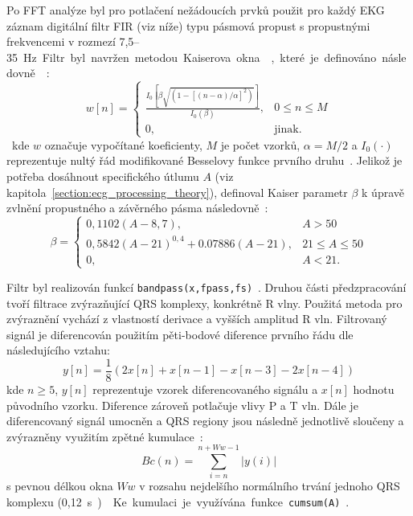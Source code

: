 Po FFT analýze byl pro potlačení nežádoucích prvků použit pro každý EKG záznam
digitální filtr FIR (viz níže) typu pásmová propust s propustnými frekvencemi v rozmezí
7,5--35~\si\Hz. Filtr byl navržen metodou Kaiserova okna~\cite{Chavan2006},
které je definováno následovně~\cite{Oppenheim1999}:
\begin{equation}
    \label{eq:kaiser1}
    w[n] =
    \begin{cases}
        \frac{I_0[\beta\sqrt{(1-[(n-\alpha)/\alpha]^2)}]}{I_0(\beta)}, & 0 \leq n \leq M \\
        0,                                                           & \text{jinak}.
    \end{cases}
\end{equation}
kde $w$ označuje vypočítané koeficienty, $M$ je počet vzorků, $\alpha=M/2$ a
$I_0(\cdot)$ reprezentuje nultý řád modifikované Besselovy funkce prvního
druhu~\cite{BesselFcn}. Jelikož je potřeba dosáhnout specifického útlumu $A$
(viz kapitola~\ref{section:ecg_processing_theory}), definoval Kaiser parametr
$\beta$ k úpravě zvlnění propustného a závěrného pásma
následovně~\cite{Oppenheim1999}:
\begin{equation}
    \beta =
    \begin{cases}
        0,1102(A-8,7),                      & A > 50            \\
        0,5842(A-21)^{0,4} + 0.07886(A-21), & 21 \leq A \leq 50 \\
        0,                                  & A < 21.
    \end{cases}
\end{equation}

Filtr byl realizován funkcí \texttt{bandpass(x,fpass,fs)}~\cite{matlabBANDPASS}.
Druhou části předzpracování tvoří filtrace zvýrazňující QRS komplexy, konkrétně
R vlny. Použitá metoda pro zvýraznění vychází z vlastností derivace a vyšších
amplitud R vln. Filtrovaný signál je diferencován použitím pěti-bodové diference
prvního řádu dle následujícího vztahu:
\begin{equation}
    \label{eq:differentiation}
    y[n] = \frac{1}{8}(2x[n] + x[n-1] - x[n-3] - 2x[n-4])
\end{equation}
kde $n \geq 5$, $y[n]$ reprezentuje vzorek diferencovaného signálu a $x[n]$
hodnotu původního vzorku. Diference zároveň potlačuje vlivy P a T vln.
Dále je diferencovaný signál umocněn a QRS regiony jsou
následně jednotlivě sloučeny a zvýrazněny využitím zpětné
kumulace~\cite{Wang2017}:
\begin{equation}
    \label{eq:backward_cumulation}
    Bc(n) = \sum_{i=n}^{n+Ww-1} |y(i)|
\end{equation}
s pevnou délkou okna $Ww$ v rozsahu nejdelšího normálního trvání jednoho QRS
komplexu (0,12~\si\s)~\cite{Wang2017}. Ke kumulaci je využívána funkce
\texttt{cumsum(A)}~\cite{matlabCUMSUM}.

